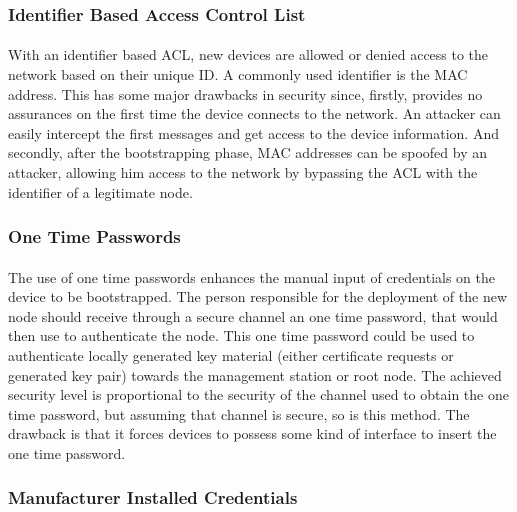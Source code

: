 \subsubsection{Identifier Based Access Control List}
\paragraph{}
With an identifier based \ac{ACL}, new devices are allowed or denied access to the network based on their unique ID. A commonly used identifier is the MAC address. This has some major drawbacks in security since, firstly, provides no assurances on the first time the device connects to the network. An attacker can easily intercept the first messages and get access to the device information. And secondly, after the bootstrapping phase, MAC addresses can be spoofed by an attacker, allowing him access to the network by bypassing the \ac{ACL} with the identifier of a legitimate node.

\subsubsection{One Time Passwords}
\paragraph{}
The use of one time passwords enhances the manual input of credentials on the device to be bootstrapped. The person responsible for the deployment of the new node should receive through a secure channel an one time password, that would then use to authenticate the node. This one time password could be used to authenticate locally generated key material (either certificate requests or generated key pair) towards the management station or root node. The achieved security level is proportional to the security of the channel used to obtain the one time password, but assuming that channel is secure, so is this method. The drawback is that it forces devices to possess some kind of interface to insert the one time password.

\subsubsection{Manufacturer Installed Credentials}

